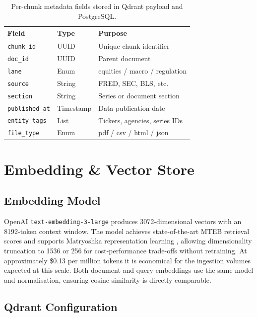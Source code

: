 \documentclass[10pt,a4paper,twocolumn]{article}
\begin{document}
\begin{table}[H]
\centering
\caption{Per-chunk metadata fields stored in Qdrant payload and PostgreSQL.}
\label{tab:metadata}
\scriptsize
\begin{tabular}{lll}
\toprule
\textbf{Field} & \textbf{Type} & \textbf{Purpose} \\
\midrule
\texttt{chunk\_id}     & UUID      & Unique chunk identifier \\
\texttt{doc\_id}       & UUID      & Parent document \\
\texttt{lane}          & Enum      & equities / macro / regulation \\
\texttt{source}        & String    & FRED, SEC, BLS, etc. \\
\texttt{section}       & String    & Series or document section \\
\texttt{published\_at} & Timestamp & Data publication date \\
\texttt{entity\_tags}  & List      & Tickers, agencies, series IDs \\
\texttt{file\_type}    & Enum      & pdf / csv / html / json \\
\bottomrule
\end{tabular}
\end{table}

\section{Embedding \& Vector Store}

\subsection{Embedding Model}

OpenAI \texttt{text-embedding-3-large} produces 3072-dimensional vectors with an 8192-token
context window. The model achieves state-of-the-art MTEB retrieval scores and supports
Matryoshka representation learning \cite{kusupati2022matryoshka}, allowing dimensionality
truncation to 1536 or 256 for cost-performance trade-offs without retraining. At approximately
\$0.13 per million tokens it is economical for the ingestion volumes expected at this scale.
Both document and query embeddings use the same model and normalisation, ensuring cosine
similarity is directly comparable.

\subsection{Qdrant Configuration}
\end{document}
